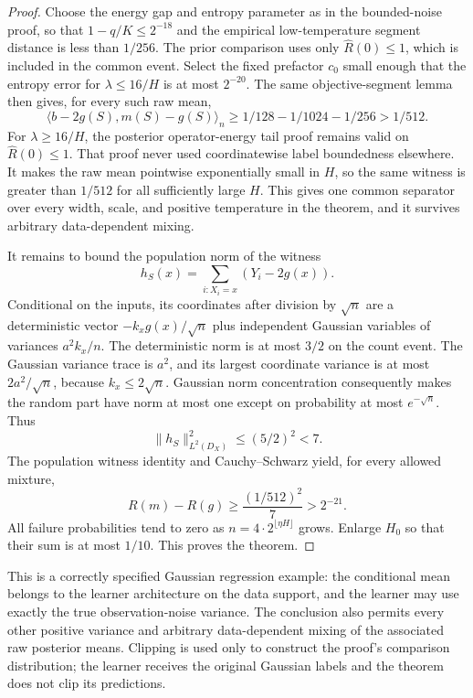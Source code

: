 \begin{proof}
Choose the energy gap and entropy parameter as in the bounded-noise proof, so that $1-q/K\le2^{-18}$ and the empirical low-temperature segment distance is less than $1/256$. The prior comparison uses only $\widehat R(0)\le1$, which is included in the common event. Select the fixed prefactor $c_0$ small enough that the entropy error for $\lambda\le16/H$ is at most $2^{-20}$. The same objective-segment lemma then gives, for every such raw mean,
\[
 \langle b-2g(S),m(S)-g(S)\rangle_n
 \ge1/128-1/1024-1/256>1/512.
\]
For $\lambda\ge16/H$, the posterior operator-energy tail proof remains valid on $\widehat R(0)\le1$. That proof never used coordinatewise label boundedness elsewhere. It makes the raw mean pointwise exponentially small in $H$, so the same witness is greater than $1/512$ for all sufficiently large $H$. This gives one common separator over every width, scale, and positive temperature in the theorem, and it survives arbitrary data-dependent mixing.

It remains to bound the population norm of the witness
\[
 h_S(x)=\sum_{i:X_i=x}(Y_i-2g(x)).
\]
Conditional on the inputs, its coordinates after division by $\sqrt n$ are a deterministic vector $-k_xg(x)/\sqrt n$ plus independent Gaussian variables of variances $a^2k_x/n$. The deterministic norm is at most $3/2$ on the count event. The Gaussian variance trace is $a^2$, and its largest coordinate variance is at most $2a^2/\sqrt n$, because $k_x\le2\sqrt n$. Gaussian norm concentration consequently makes the random part have norm at most one except on probability at most $e^{-\sqrt n}$. Thus
\[
 \|h_S\|_{L^2(D_X)}^2\le(5/2)^2<7.
\]
The population witness identity and Cauchy--Schwarz yield, for every allowed mixture,
\[
 R(m)-R(g)\ge\frac{(1/512)^2}{7}>2^{-21}.
\]
All failure probabilities tend to zero as $n=4\cdot2^{\lfloor\eta H\rfloor}$ grows. Enlarge $H_0$ so that their sum is at most $1/10$. This proves the theorem.
\end{proof}

This is a correctly specified Gaussian regression example: the conditional mean belongs to the learner architecture on the data support, and the learner may use exactly the true observation-noise variance. The conclusion also permits every other positive variance and arbitrary data-dependent mixing of the associated raw posterior means. Clipping is used only to construct the proof's comparison distribution; the learner receives the original Gaussian labels and the theorem does not clip its predictions.
